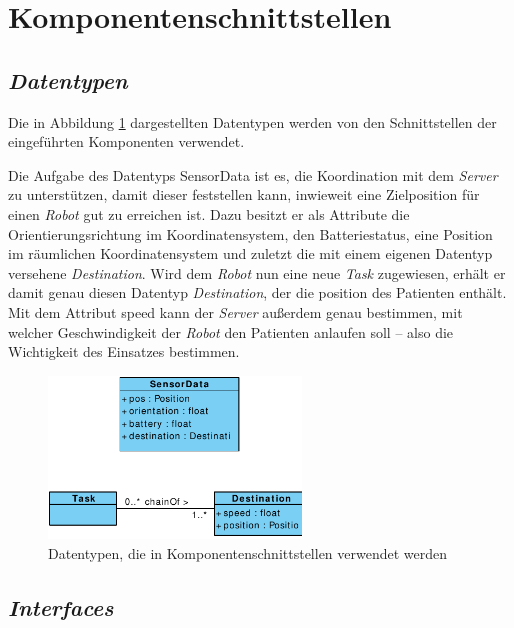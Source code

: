 \section{Komponentenschnittstellen}

\subsection{\textit{Datentypen}}
Die in Abbildung \ref{KomponentenschnittstellenDiagramm} dargestellten Datentypen werden von den Schnittstellen der eingeführten Komponenten verwendet.

Die Aufgabe des Datentyps SensorData ist es, die Koordination mit dem \emph{Server} zu unterstützen, damit dieser feststellen kann, inwieweit eine Zielposition für einen \emph{Robot} gut zu erreichen ist. Dazu besitzt er als Attribute die Orientierungsrichtung im Koordinatensystem, den Batteriestatus, eine Position im räumlichen Koordinatensystem und zuletzt die mit einem eigenen Datentyp versehene \emph{Destination}. Wird dem \emph{Robot} nun eine neue \emph{Task} zugewiesen, erhält er damit genau diesen Datentyp \emph{Destination}, der die position des Patienten enthält. Mit dem Attribut speed kann der \emph{Server} außerdem genau bestimmen, mit welcher Geschwindigkeit der \emph{Robot} den Patienten anlaufen soll – also die Wichtigkeit des Einsatzes bestimmen.
\vspace{1cm}

	\begin{figure}[H]
		\centering
		\includegraphics[width=0.6\textwidth]{img/0-Entwurf-3}
		\caption{Datentypen, die in Komponentenschnittstellen verwendet werden}
		\label{KomponentenschnittstellenDiagramm}
	\end{figure}
	\pagebreak

\subsection{\textit{Interfaces}}
